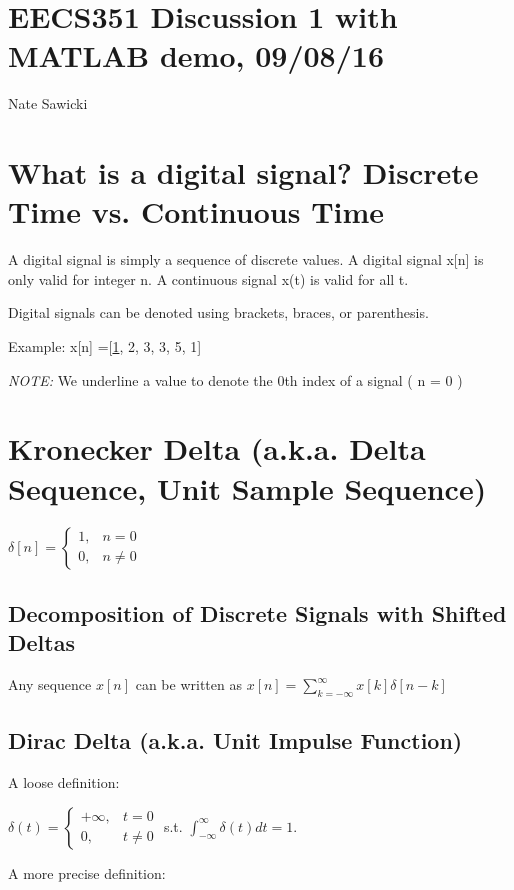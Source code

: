 \documentclass[11pt]{article}
\begin{document}
\section*{EECS351 Discussion 1 with MATLAB demo, 09/08/16}
Nate Sawicki

\section{What is a digital signal? Discrete Time vs. Continuous Time}

A digital signal is simply a sequence of discrete values. A digital signal x[n] is only valid for integer n. A continuous signal x(t) is valid for all t.


Digital signals can be denoted using brackets, braces, or parenthesis.  \newline

Example: x[n] =[\underline{1}, 2, 3, 3, 5, 1]

\emph{NOTE:} We underline a value to denote the 0th index of a signal ( n = 0 )


\section{Kronecker Delta (a.k.a. Delta Sequence, Unit Sample Sequence)}

$\delta[n] = \begin{cases}1, & n = 0 \\ 0, & n\neq 0 \end{cases}$

\subsection{Decomposition of Discrete Signals with Shifted Deltas}
Any sequence $x[n]$ can be written as $x[n]=\sum\limits_{k=-\infty}^\infty x[k]\delta[n-k]$

\subsection{Dirac Delta (a.k.a. Unit Impulse Function)}

A loose definition:

$\delta(t) = \begin{cases} +\infty,& t = 0 \\ 0, & t \neq 0 \end{cases}$ \quad  s.t. $\int_{-\infty}^\infty \delta(t) dt = 1$.


A more precise definition:
\end{document}
